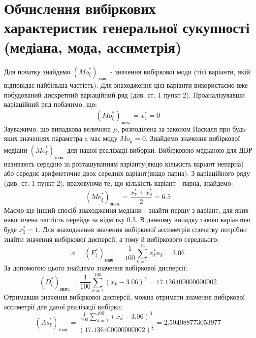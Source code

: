 \documentclass{article}
\begin{document}
\section{Обчислення вибіркових характеристик генеральної 
сукупності (медіана, мода, ассиметрія)}
Для початку знайдемо $({Mo}_\xi^*)_{\text{знач.}}$ - 
значення вибіркової моди (тієї варіанти, якій відповідає 
найбільша частість). Для знаходження цієї варіанти використаємо
вже побудований дискретний варіаційний ряд (див. ст. 1 пункт 2).
Проаналізувавши варіаційний ряд побачимо, що:
$$({Mo}_\xi^*)_{\text{знач.}} = x_1^* = 0$$
Зауважимо, що випадкова величина $\mu$, розподілена за 
законом Паскаля при будь-яких значеннях параметра a
має моду ${Mo}_\mu = 0$.
\newline
\newline
Знайдемо значення вибіркової медіани $({Me}_\xi^*)_{\text{знач.}}$ 
для нашої реалізації виборки. Вибірковою медіаною для ДВР називають 
середню за розташуванням варіанту(якщо кількість варіант непарна) 
або середнє арифметичне двох середніх варіант(якщо парна).
З варіаційного ряду (див. ст. 1 
пункт 2), враховуючи те, що кількість варіант - парна, 
знайдемо:$$ ({Me}_\xi^*)_{\text{знач.}} = \frac{x_7^* + x_8^*}
{2} = 6.5 $$
Маємо ще інший спосіб знаходження медіани - знайти першу з варіант, 
для яких накопичена частість перейде за відмітку 0.5. В данному випадку 
такою варіантою буде $x_2^* = 1.$
\newline
Для знаходження значення вибіркової ассиметрія спочатку потрібно 
знайти значення вибіркової дисперсії, а тому й вибіркового середнього: 
$$\overline{x} = (E^*_{\xi})_{\text{знач.}} = \frac{1}{100} 
\sum_{k = 1}^{14} x_k^* n_k = 3.06$$
За допомогою цього знайдемо значення вибіркової дисперсії:
$$(D^*_{\xi})_{\text{знач.}} = \frac{1}{100} \sum_{k = 1}^{100}
(x_k - 3.06)^2 = 17.136400000000002$$
Отримавши значення вибіркової дисперсії, можна отримати значення
вибіркової ассиметрії для даної реалізації вибірки:
$$({As}_{\xi}^*)_{\text{знач.}} = \frac{\frac{1}{100}
\sum_{k = 1}^{100}(x_k - 3.06)^3}{(17.136400000000002)^
{\frac{3}{2}}} = 2.504088773053977$$
\end{document}
